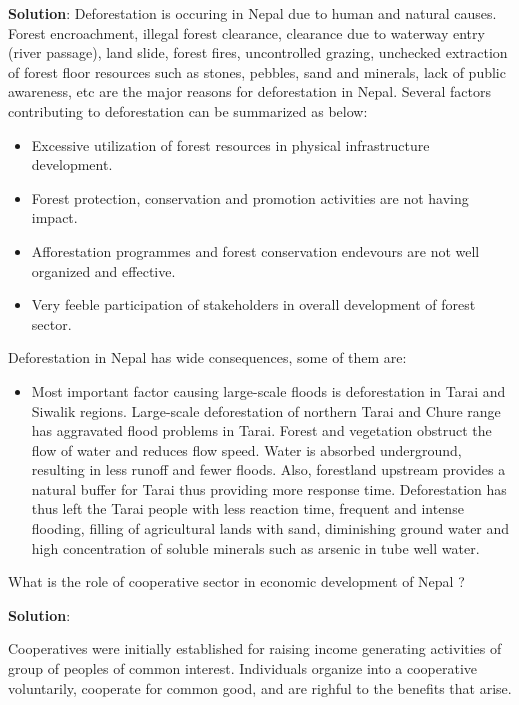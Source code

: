 \documentclass[
  openany]{book}
\newcommand{\question}{\item}
\newenvironment{solution}{ {\bfseries Solution}:}{}
\begin{document}
\begin{questions}
\begin{solution}
Deforestation is occuring in Nepal due to human and natural causes. Forest encroachment, illegal forest clearance, clearance due to waterway entry (river passage), land slide, forest fires, uncontrolled grazing, unchecked extraction of forest floor resources such as stones, pebbles, sand and minerals, lack of public awareness, etc are the major reasons for deforestation in Nepal. Several factors contributing to deforestation can be summarized as below:
\begin{itemize}
\item Excessive utilization of forest resources in physical infrastructure development.
\item Forest protection, conservation and promotion activities are not having impact.
\item Afforestation programmes and forest conservation endevours are not well organized and effective.
\item Very feeble participation of stakeholders in overall development of forest sector.
\end{itemize}

Deforestation in Nepal has wide consequences, some of them are:

\begin{itemize}
\item Most important factor causing large-scale floods is deforestation in Tarai and Siwalik regions. Large-scale deforestation of northern Tarai and Chure range has aggravated flood problems in Tarai. Forest and vegetation obstruct the flow of water and reduces flow speed. Water is absorbed underground, resulting in less runoff and fewer floods. Also, forestland upstream provides a natural buffer for Tarai thus providing more response time. Deforestation has thus left the Tarai people with less reaction time, frequent and intense flooding, filling of agricultural lands with sand, diminishing ground water and high concentration of soluble minerals such as arsenic in tube well water.
\end{itemize}

\end{solution}

\question What is the role of cooperative sector in economic development of Nepal ?

\begin{solution}

Cooperatives were initially established for raising income generating activities of group of peoples of common interest. Individuals organize into a cooperative voluntarily, cooperate for common good, and are righful to the benefits that arise.


\end{solution}
\end{questions}
\end{document}
